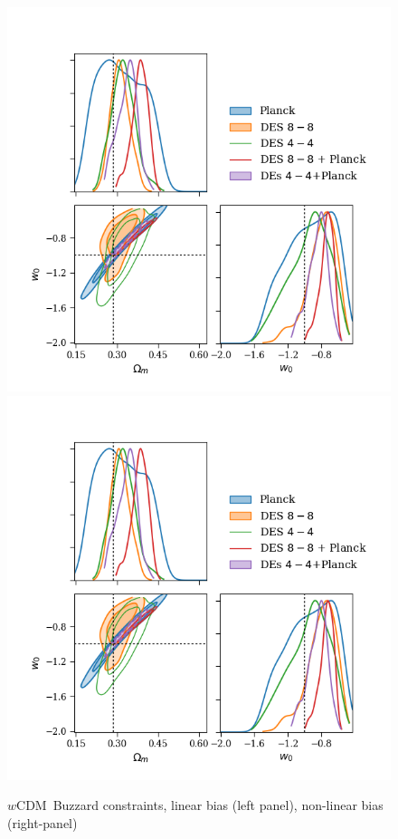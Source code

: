 \documentclass[fleqn,usenatbib]{mnras}
\newcommand{\wcdm}{$w$CDM}
\begin{document}
\begin{figure}
\includegraphics[width=\columnwidth]{figs/buzzard_wcdm_lin_om-w.png}
\includegraphics[width=\columnwidth]{figs/buzzard_wcdm_lin_om-w.png}
\caption[]{\wcdm\ Buzzard constraints, linear bias (left panel), non-linear bias (right-panel)}
\label{fig:color_ims}
\end{figure}
\end{document}
